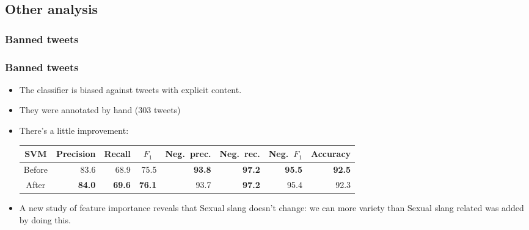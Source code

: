 \subsection{Other analysis}

\subsubsection{Banned tweets}
\begin{frame}
    \frametitle{Banned tweets}

    \begin{itemize}
        \item The classifier is biased against tweets with explicit content.
        \item They were annotated by hand (303 tweets)
        \item There's a little improvement:
        \begin{center}
            \scriptsize
            \begin{tabular}{ c r r r r r r r }
                \textbf{SVM} & \multicolumn{1}{c}{Precision} & \multicolumn{1}{c}{Recall} & \multicolumn{1}{c}{$F_1$} & \multicolumn{1}{c}{Neg.\ prec.} & \multicolumn{1}{c}{Neg.\ rec.} & \multicolumn{1}{c}{Neg.\ $F_1$} & \multicolumn{1}{c}{Accuracy} \\
                \midrule
                Before & 83.6 & 68.9 & 75.5 & \textbf{93.8} & \textbf{97.2} & \textbf{95.5} & \textbf{92.5} \\
                \midrule
                After & \textbf{84.0} & \textbf{69.6} & \textbf{76.1} & 93.7 & \textbf{97.2} & 95.4 & 92.3 \\
            \end{tabular}
        \end{center}
        \item A new study of feature importance reveals that Sexual slang doesn't change: we can more variety than Sexual slang related was added by doing this.
    \end{itemize}
\end{frame}

